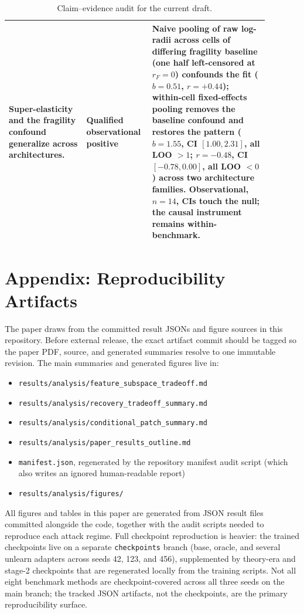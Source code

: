 \documentclass{article}
\begin{document}
\begin{table}[t]
\begin{tabular}{p{0.28\linewidth} p{0.18\linewidth} p{0.42\linewidth}}
    Super-elasticity and the fragility confound generalize across architectures. & Qualified observational positive & Naive pooling of raw log-radii across cells of differing fragility baseline (one half left-censored at $r_F{=}0$) confounds the fit ($b{=}0.51$, $r{=}{+}0.44$); within-cell fixed-effects pooling removes the baseline confound and restores the pattern ($b{=}1.55$, CI $[1.00,2.31]$, all LOO $>1$; $r{=}{-}0.48$, CI $[-0.78,0.00]$, all LOO $<0$) across two architecture families. Observational, $n{=}14$, CIs touch the null; the causal instrument remains within-benchmark. \\
    \bottomrule
  \end{tabular}
  \caption{Claim--evidence audit for the current draft.}
  \label{tab:claim-evidence}
\end{table}

\section{Appendix: Reproducibility Artifacts}
The paper draws from the committed result JSONs and figure sources in this repository. Before external release, the exact artifact commit should be tagged so the paper PDF, source, and generated summaries resolve to one immutable revision. The main summaries and generated figures live in:
\begin{itemize}[leftmargin=1.5em]
  \item \texttt{results/analysis/feature\_subspace\_tradeoff.md}
  \item \texttt{results/analysis/recovery\_tradeoff\_summary.md}
  \item \texttt{results/analysis/conditional\_patch\_summary.md}
  \item \texttt{results/analysis/paper\_results\_outline.md}
  \item \texttt{manifest.json}, regenerated by the repository manifest audit script (which also writes an ignored human-readable report)
  \item \texttt{results/analysis/figures/}
\end{itemize}

All figures and tables in this paper are generated from JSON result files committed alongside the code, together with the audit scripts needed to reproduce each attack regime. Full checkpoint reproduction is heavier: the trained checkpoints live on a separate \texttt{checkpoints} branch (base, oracle, and several unlearn adapters across seeds 42, 123, and 456), supplemented by theory-era and stage-2 checkpoints that are regenerated locally from the training scripts. Not all eight benchmark methods are checkpoint-covered across all three seeds on the main branch; the tracked JSON artifacts, not the checkpoints, are the primary reproducibility surface.
\end{document}
